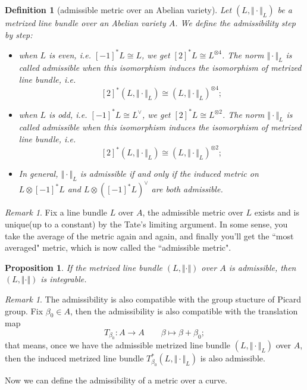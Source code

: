 \documentclass[reqno,11pt]{amsart}
\numberwithin{equation}{section}
\theoremstyle{plain}
\newtheorem{proposition}[theorem]{Proposition}
\newtheorem{defn}[theorem]{Definition}
\theoremstyle{plain}
\numberwithin{equation}{section}
\theoremstyle{remark}
\newtheorem{remark}[theorem]{Remark}
\newcommand{\norm}[1]{\Vert{#1}\Vert}
\begin{document}
\begin{defn}[admissible metric over an Abelian variety]
Let $(L,\norm{\cdot}_L)$ be a metrized line bundle over an Abelian variety $A$. We define the admissibility step by step:
\begin{itemize}
\item  when $L$ is even, i.e. $[-1]^*L\cong L$, we get $[2]^*L\cong L^{\otimes 4}$. The norm $\norm{\cdot}_L$ is called admissible when this isomorphism induces the isomorphism of metrized line bundle, i.e.
$$[2]^*(L,\norm{\cdot}_L)\cong (L,\norm{\cdot}_L)^{\otimes 4};$$ 
\item  when $L$ is odd, i.e. $[-1]^*L\cong L^{\vee}$, we get $[2]^*L\cong L^{\otimes 2}$. The norm $\norm{\cdot}_L$ is called admissible when this isomorphism induces the isomorphism of metrized line bundle, i.e.
$$[2]^*(L,\norm{\cdot}_L)\cong (L,\norm{\cdot}_L)^{\otimes 2};$$ 
\item In general, $\norm{\cdot}_L$ is admissible if and only if the induced metric on $L \otimes [-1]^*L$ and $L \otimes ([-1]^*L)^{\vee}$ are both admissible.
\end{itemize}
\end{defn}
\begin{remark}
Fix a line bundle $L$ over $A$, the admissible metric over $L$ exists and is unique(up to a constant) by the Tate's limiting argument. In some sense, you take the average of the metric again and again, and finally you'll get the ``most averaged" metric, which is now called the ``admissible metric".
\end{remark}
\begin{proposition}
If the metrized line bundle $(L,\norm{\cdot})$ over $A$ is admissible, then $(L,\norm{\cdot})$ is integrable.
\end{proposition}
\begin{remark}
The admissibility is also compatible with the group stucture of Picard group. Fix $\beta_0 \in A$, then the admissibility is also compatible with the translation map
$$T_{\beta_0}: A\longrightarrow A \qquad \beta \longmapsto \beta+\beta_0;$$
that means, once we have the admissible metrized line bundle $(L,\norm{\cdot}_L)$ over $A$, then the induced metrized line bundle $T_{\beta_0}^{*}(L,\norm{\cdot}_L)$ is also admissible.
\end{remark}
Now we can define the admissibility of a metric over a curve.
\end{document}
